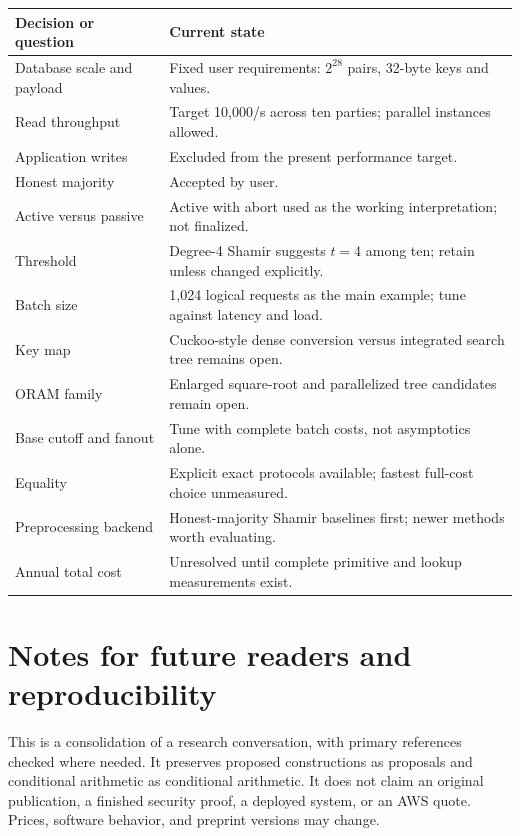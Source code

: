 \documentclass[11pt]{article}
\begin{document}
\begin{tabularx}{\textwidth}{@{}p{}Y@{}}
\toprule
Decision or question & Current state \\
\midrule
Database scale and payload & Fixed user requirements: $2^{28}$ pairs, 32-byte keys and values. \\
Read throughput & Target 10,000/s across ten parties; parallel instances allowed. \\
Application writes & Excluded from the present performance target. \\
Honest majority & Accepted by user. \\
Active versus passive & Active with abort used as the working interpretation; not finalized. \\
Threshold & Degree-4 Shamir suggests $t=4$ among ten; retain unless changed explicitly. \\
Batch size & 1,024 logical requests as the main example; tune against latency and load. \\
Key map & Cuckoo-style dense conversion versus integrated search tree remains open. \\
ORAM family & Enlarged square-root and parallelized tree candidates remain open. \\
Base cutoff and fanout & Tune with complete batch costs, not asymptotics alone. \\
Equality & Explicit exact protocols available; fastest full-cost choice unmeasured. \\
Preprocessing backend & Honest-majority Shamir baselines first; newer methods worth evaluating. \\
Annual total cost & Unresolved until complete primitive and lookup measurements exist. \\
\bottomrule
\end{tabularx}

\section{Notes for future readers and reproducibility}\label{sec:provenance}

This is a consolidation of a research conversation, with primary references
checked where needed. It preserves proposed constructions as proposals and
conditional arithmetic as conditional arithmetic. It does not claim an original
publication, a finished security proof, a deployed system, or an AWS quote.
Prices, software behavior, and preprint versions may change.
\end{document}
